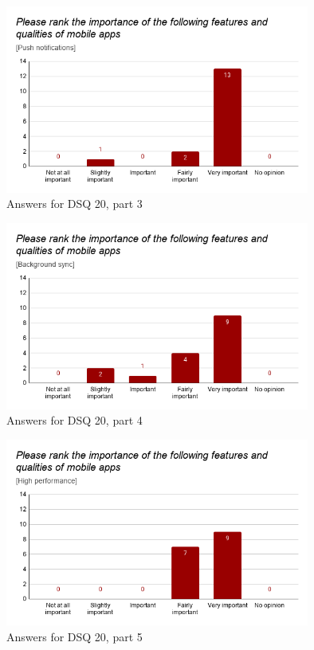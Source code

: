 \documentclass[a4paper,12pt]{article}
\begin{document}
\begin{figure}[ht!]
    \centering
    \includegraphics[width=10cm]{img/Results/dsq20_3.png}
    \caption{Answers for DSQ 20, part 3}
    \label{fig:res_devq20_3}
\end{figure}
\newpage

\begin{figure}[ht!]
    \centering
    \includegraphics[width=10cm]{img/Results/dsq20_4.png}
    \caption{Answers for DSQ 20, part 4}
    \label{fig:res_devq20_4}
\end{figure}

\begin{figure}[ht!]
    \centering
    \includegraphics[width=10cm]{img/Results/dsq20_5.png}
    \caption{Answers for DSQ 20, part 5}
    \label{fig:res_devq20_5}
\end{figure}
\end{document}

